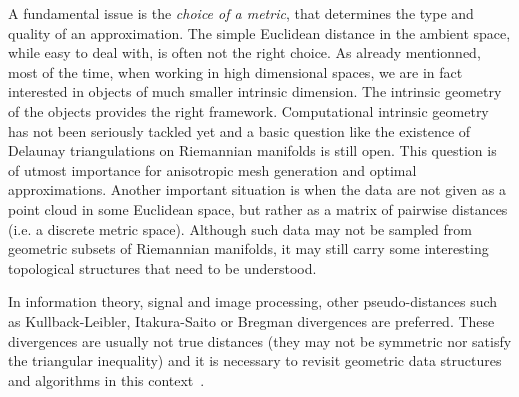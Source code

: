 A fundamental issue 
is  the {\em choice of a metric}, 
that determines the type and quality of an approximation.
 The simple Euclidean distance in the ambient space, while easy to deal with, is often not the right choice.  As already mentionned, most of the time, when working in high dimensional spaces, we are in fact interested in objects of much smaller intrinsic dimension. The intrinsic geometry of the objects provides the right framework. Computational intrinsic geometry has not been seriously tackled yet and a basic question like the existence of  Delaunay triangulations on Riemannian manifolds is still open.  This question is of utmost importance for anisotropic mesh generation and optimal approximations. Another important situation is when the data are not given as a point cloud in some Euclidean space, but rather as a matrix of pairwise distances (i.e. a discrete metric space). Although such data may not be sampled from geometric subsets of Riemannian manifolds, it may still carry some interesting topological structures that need to be understood. 

In information theory, signal and image processing, other pseudo-distances such as Kullback-Leibler, Itakura-Saito or Bregman divergences are preferred.  
These divergences are usually not true distances (they may not be symmetric nor satisfy the triangular inequality) and it is necessary to revisit geometric data structures and algorithms in this context~\cite{geometrica-6154a}.




